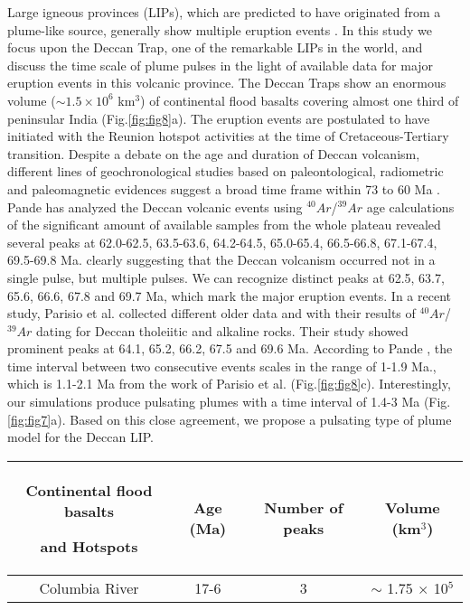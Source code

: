 \documentclass[12pt]{article}
\begin{document}
{Large igneous provinces (LIPs), which are predicted to have originated from a plume-like source, generally show multiple eruption events \cite{haggerty1996episodes}. In this study we focus upon the Deccan Trap, one of the remarkable LIPs in the world, and discuss the time scale of plume pulses in the light of available data for major eruption events in this volcanic province. The Deccan Traps show an enormous volume 
($\sim 1.5 \times 10^6$ km$^3$) of continental flood basalts covering almost one third of peninsular India (Fig.\ref{fig:fig8}a). The eruption events are postulated to have initiated with the Reunion hotspot activities at the time of
Cretaceous-Tertiary transition. Despite a debate on the age and duration of Deccan volcanism, different lines of geochronological studies based on paleontological, radiometric and paleomagnetic evidences suggest a broad time frame within 73 to 60 Ma \cite{pande2002age, parisio201640ar}. Pande \cite{pande2002age} has analyzed the Deccan volcanic events using $^{40}Ar$/$^{39}Ar$ age calculations of the significant amount of available samples from the whole plateau revealed several peaks at 62.0-62.5, 63.5-63.6, 64.2-64.5, 65.0-65.4, 66.5-66.8, 67.1-67.4, 69.5-69.8 Ma. clearly suggesting that the Deccan volcanism occurred not in a single pulse, but multiple pulses. We can recognize distinct peaks at 62.5, 63.7, 65.6, 66.6, 67.8 and 69.7 Ma, which mark the major eruption events. In a recent study, Parisio et al. \cite{parisio201640ar} collected different older data and with their results of $^{40}Ar$/$^{39}Ar$ dating for Deccan tholeiitic and alkaline rocks. Their study showed prominent peaks at 64.1, 65.2, 66.2, 67.5 and 69.6 Ma. According to Pande \cite{pande2002age}, the time interval between two consecutive events scales in the range of 1-1.9 Ma., which is 1.1-2.1 Ma from the work of Parisio et al. \cite{parisio201640ar} (Fig.\ref{fig:fig8}c). Interestingly, our simulations produce pulsating plumes with a time interval of 1.4-3 Ma (Fig.\ref{fig:fig7}a). Based on this close agreement, we propose a pulsating type of plume model for the Deccan LIP. 




\begin{table}[htb!]
\begin{center}
\begin{tabular}{|c   c   c   c |}
\hline
Continental flood basalts
 
 
 
and Hotspots & Age (Ma) &  Number of peaks    & Volume (km$^3$) \\
\hline
Columbia River       & 17-6  &  3  & $\sim$ 1.75 $\times$ 10$^{5}$  \cite{tolan1989revisions}  \\


\end{tabular}
\end{center}
\end{table}}
\end{document}
